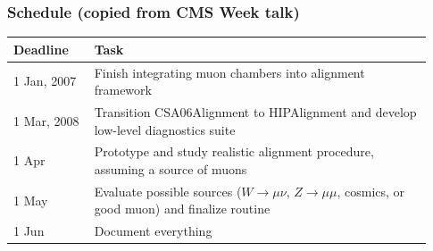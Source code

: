 \documentclass[compress]{beamer}
\begin{document}
\begin{frame}
  \frametitle{Schedule (copied from CMS Week talk)}

  \renewcommand{\arraystretch}{1.5}
  \begin{tabular}{p{0.18\linewidth} p{0.75\linewidth}}
    Deadline & Task \\ \hline

    \textcolor{dkblue}{1 Jan,} \hfill \textcolor{dkblue}{2007} & \textcolor{dkblue}{Finish integrating muon chambers into alignment framework} \\

      1 Mar, \hfill 2008 & Transition CSA06Alignment to HIPAlignment and
      develop low-level diagnostics suite \\

      1 Apr & \textcolor{dkblue}{Prototype} and study realistic alignment procedure, assuming a
      source of muons \\
 
      1 May & Evaluate possible sources ($W\to\mu\nu$, $Z\to\mu\mu$,
      cosmics, or good muon) and finalize routine \\

      1 Jun & Document everything
  \end{tabular}
\end{frame}
\end{document}

